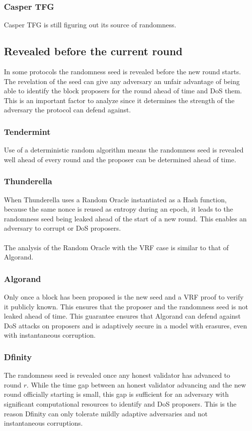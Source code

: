 \documentclass[10pt,journal,compsoc]{IEEEtran}
\begin{document}
\subsubsection{Casper TFG}
Casper TFG is still figuring out its source of randomness.
\subsection{Revealed before the current round}
In some protocols the randomness seed is revealed before the new round starts. The revelation of the seed can give any adversary an unfair advantage of being able to identify the block proposers for the round ahead of time and DoS them. This is an important factor to analyze since it determines the strength of the adversary the protocol can defend against. 
\subsubsection{Tendermint}
Use of a deterministic random algorithm means the randomness seed is revealed well ahead of every round and the proposer can be determined ahead of time. 
\subsubsection{Thunderella}
When Thunderella uses a Random Oracle instantiated as a Hash function, because the same nonce is reused as entropy during an epoch, it leads to the randomness seed being leaked ahead of the start of a new round. This enables an adversary to corrupt or DoS proposers. 
\\\\
The analysis of the Random Oracle with the VRF case is similar to that of Algorand. 
\subsubsection{Algorand}
Only once a block has been proposed is the new seed and a VRF proof to verify it publicly known. This ensures that the proposer and the randomness seed is not leaked ahead of time. This guarantee ensures that Algorand can defend against DoS attacks on proposers and is adaptively secure in a model with erasures, even with instantaneous corruption.
\subsubsection{Dfinity} 
The randomness seed is revealed once any honest validator has advanced to round $r$. While the time gap between an honest validator advancing and the new round officially starting is small, this gap is sufficient for an adversary with significant computational resources to identify and DoS proposers. This is the reason Dfinity can only tolerate mildly adaptive adversaries and not instantaneous corruptions. 
\end{document}
